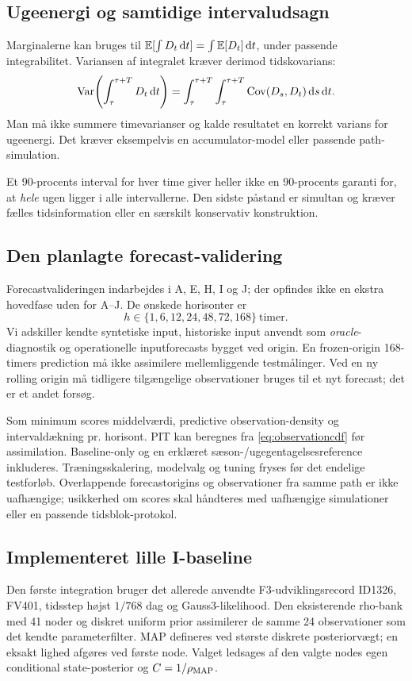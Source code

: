 \subsection{Ugeenergi og samtidige intervaludsagn}
Marginalerne kan bruges til \(\mathbb E[\int D_t\,\mathrm d t]=\int\mathbb E[D_t]\,\mathrm d t\), under passende integrabilitet. Variansen af integralet kræver derimod tidskovarians:
\begin{equation}
 \operatorname{Var}\!\left(\int_\tau^{\tau+T}D_t\,\mathrm d t\right)
 =\int_\tau^{\tau+T}\int_\tau^{\tau+T}\operatorname{Cov}(D_s,D_t)\,\mathrm d s\,\mathrm d t.
 \label{eq:energyvariance}
\end{equation}
Man må ikke summere timevarianser og kalde resultatet en korrekt varians for ugeenergi. Det kræver eksempelvis en accumulator-model eller passende path-simulation.

Et 90-procents interval for hver time giver heller ikke en 90-procents garanti for, at \emph{hele} ugen ligger i alle intervallerne. Den sidste påstand er simultan og kræver fælles tidsinformation eller en særskilt konservativ konstruktion.

\subsection{Den planlagte forecast-validering}
Forecastvalideringen indarbejdes i A, E, H, I og J; der opfindes ikke en ekstra hovedfase uden for A--J. De ønskede horisonter er
\begin{equation}
 h\in\{1,6,12,24,48,72,168\}\ \text{timer}.
 \label{eq:horizons}
\end{equation}
Vi adskiller kendte syntetiske input, historiske input anvendt som \emph{oracle}-diagnostik og operationelle inputforecasts bygget ved origin. En frozen-origin 168-timers prediction må ikke assimilere mellemliggende testmålinger. Ved en ny rolling origin må tidligere tilgængelige observationer bruges til et nyt forecast; det er et andet forsøg.

Som minimum scores middelværdi, predictive observation-density og intervaldækning pr. horisont. PIT kan beregnes fra \eqref{eq:observationcdf} før assimilation. Baseline-only og en erklæret sæson-/ugegentagelsesreference inkluderes. Træningsskalering, modelvalg og tuning fryses før det endelige testforløb. Overlappende forecastorigins og observationer fra samme path er ikke uafhængige; usikkerhed om scores skal håndteres med uafhængige simulationer eller en passende tidsblok-protokol.

\subsection{Implementeret lille I-baseline}
Den første integration bruger det allerede anvendte F3-udviklingsrecord ID1326,
FV401, tidsstep højst $1/768$ dag og Gauss3-likelihood. Den eksisterende rho-bank
med 41 noder og diskret uniform prior assimilerer de samme 24 observationer som
det kendte parameterfilter. MAP defineres ved største diskrete posteriorvægt;
en eksakt lighed afgøres ved første node. Valget ledsages af den valgte nodes
egen conditional state-posterior og $C=1/\rho_{\rm MAP}$.

